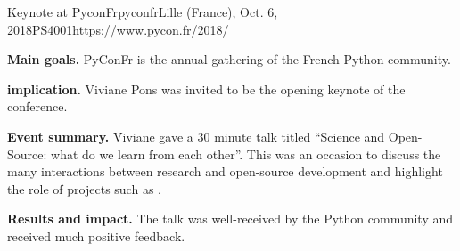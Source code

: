 \begin{event}{Keynote at PyconFr}{pyconfr}{Lille (France), Oct. 6, 2018}{PS}{400}{1}{https://www.pycon.fr/2018/}

\textbf{Main goals.} PyConFr is the annual gathering of the French Python community.

\textbf{\ODK implication.} Viviane Pons was invited to be the opening keynote of the conference.

\textbf{Event summary.} Viviane gave a 30 minute talk titled ``Science and Open-Source: what do we learn from each other''. This was an occasion to discuss the many interactions between research and open-source development and highlight the role of projects such as \ODK.

\textbf{Results and impact.} The talk was well-received by the Python community and received much positive feedback.

\end{event}
